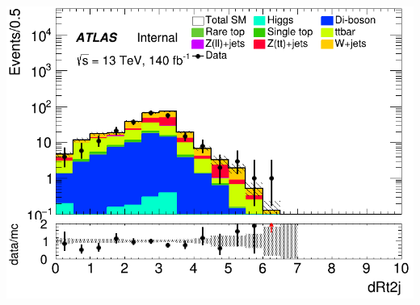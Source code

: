 \documentclass[usenames,dvipsnames]{beamer}
\begin{document}
\begin{frame}
\begin{minipage}{0.32\textwidth}
        \includegraphics[width=\textwidth]{graphics/LHH_met/LHH_met_dRt2j.png}
    \end{minipage}
    
    \vspace{0.5cm} %


\end{frame}
\end{document}
